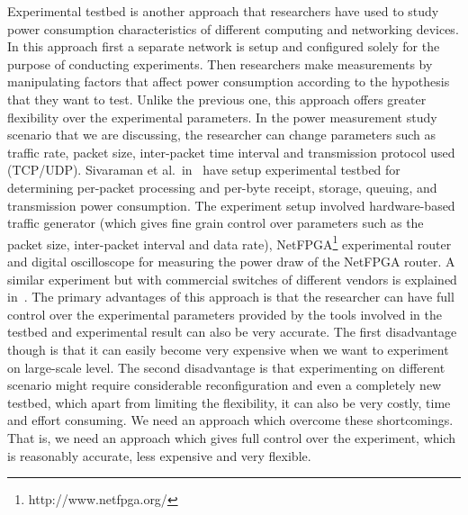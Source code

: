 Experimental testbed is another approach that researchers have used to study power consumption characteristics of different computing and networking devices. In this approach first a separate network is setup and configured solely for the purpose of conducting experiments. Then researchers make measurements by manipulating factors that affect power consumption according to the hypothesis that they want to test. Unlike the previous one, this approach offers greater flexibility over the experimental parameters. In the power measurement study scenario that we are discussing, the researcher can change parameters such as traffic rate, packet size, inter-packet time interval and transmission protocol used (TCP/UDP). Sivaraman et al.~in~\cite{Sivaraman} have setup experimental testbed for determining per-packet processing and per-byte receipt, storage, queuing, and transmission power consumption. The experiment setup involved hardware-based traffic generator (which gives fine grain control over parameters such as the packet size, inter-packet interval and data rate), NetFPGA\footnote{http://www.netfpga.org/} experimental router and digital oscilloscope for measuring the power draw of the NetFPGA router. A similar experiment but with commercial switches of different vendors is explained in~\cite{DBLP:journals/comcom/SivaramanRZSVMR14}. The primary advantages of this approach is that the researcher can have full control over the experimental parameters provided by the tools involved in the testbed and experimental result can also be very accurate. The first disadvantage though is that it can easily become very expensive when we want to experiment on large-scale level. The second disadvantage is that experimenting on different scenario might require considerable reconfiguration and even a completely new testbed, which apart from limiting the flexibility, it can also be very costly, time and effort consuming. We need an approach which overcome these shortcomings. That is, we need an approach which gives full control over the experiment, which is reasonably accurate, less expensive and very flexible. 

